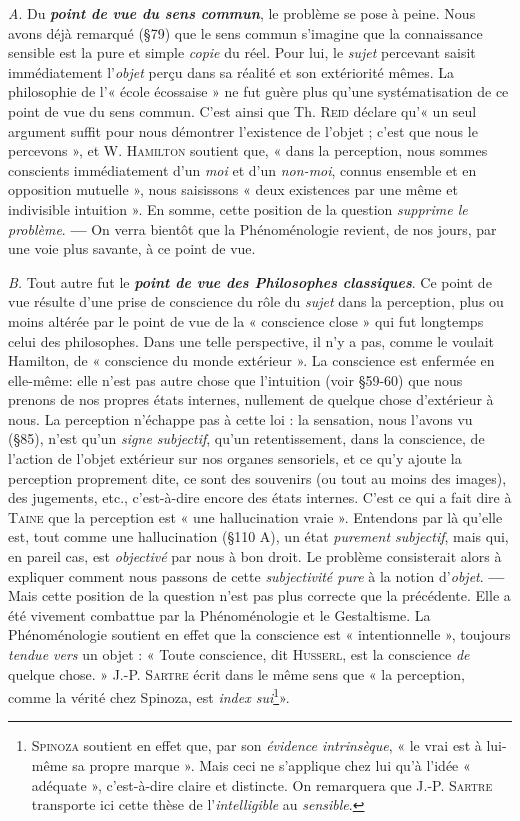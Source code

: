 {\it A}. Du \textbf{\textit {point de vue du sens commun}}, le problème se pose
à peine. Nous avons déjà remarqué (\S 79) que le sens commun s’imagine
que la connaissance sensible est la pure et simple {\it copie} du réel.
Pour lui, le {\it sujet} percevant saisit immédiatement l’{\it objet} perçu dans
sa réalité et son extériorité mêmes. La philosophie de l’« école écossaise »
ne fut guère plus qu’une systématisation de ce point de vue
du sens commun. C’est ainsi que Th. \textsc{Reid} déclare qu'« un seul
argument suffit pour nous démontrer l’existence de l’objet ; c’est
que nous le percevons », et W. \textsc{Hamilton} soutient que, « dans la
perception, nous sommes conscients immédiatement d’un {\it moi} et
d’un {\it non-moi}, connus ensemble et en opposition mutuelle », nous
saisissons « deux existences par une même et indivisible intuition ».
En somme, cette position de la question {\it supprime le problème}. {\bf —}
On verra bientôt que la Phénoménologie revient, de nos jours, par
une voie plus savante, à ce point de vue.

{\it B.} Tout autre fut le \textbf{\textit {point de vue des Philosophes classiques}}.
Ce point de vue résulte d’une prise de conscience du rôle du {\it sujet}
dans la perception, plus ou moins altérée par le point de vue de la
« conscience close » qui fut longtemps celui des philosophes. Dans une
telle perspective, il n’y a pas, comme le voulait Hamilton, de « conscience
du monde extérieur ». La conscience est enfermée en elle-même:
elle n’est pas autre chose que l’intuition (voir \S 59-60) que nous
prenons de nos propres états internes, nullement de quelque chose
d’extérieur à nous. La perception n’échappe pas à cette loi : la sensation,
nous l’avons vu (\S 85), n’est qu’un {\it signe subjectif}, qu’un retentissement,
dans la conscience, de l’action de l’objet extérieur sur nos
organes sensoriels, et ce qu’y ajoute la perception proprement dite,
ce sont des souvenirs (ou tout au moins des images), des jugements, etc.,
c’est-à-dire encore des états internes. C’est ce qui a fait dire à \textsc{Taine}
que la perception est « une hallucination vraie ». Entendons par là
qu’elle est, tout comme une hallucination (\S 110 A), un état {\it purement
subjectif}, mais qui, en pareil cas, est {\it objectivé} par nous à bon droit.
Le problème consisterait alors à expliquer comment nous passons
de cette {\it subjectivité pure} à la notion d'{\it objet}. {\bf —} Mais cette position
de la question n’est pas plus correcte que la précédente. Elle a été
vivement combattue par la Phénoménologie et le Gestaltisme. La
Phénoménologie soutient en effet que la conscience est « intentionnelle »,
toujours {\it tendue vers} un objet : « Toute conscience, dit \textsc{Husserl},
est la conscience {\it de} quelque chose. » J.-P. \textsc{Sartre} écrit dans le même
sens que « la perception, comme la vérité chez Spinoza, est {\it index sui}\footnote{\textsc{Spinoza} soutient en effet que, par son {\it évidence intrinsèque}, « le vrai est à lui-même
sa propre marque ». Mais ceci ne s'applique chez lui qu'à l’idée « adéquate », c’est-à-dire
claire et distincte. On remarquera que J.-P. \textsc{Sartre} transporte ici cette thèse de l’{\it intelligible} au {\it sensible}.}».

